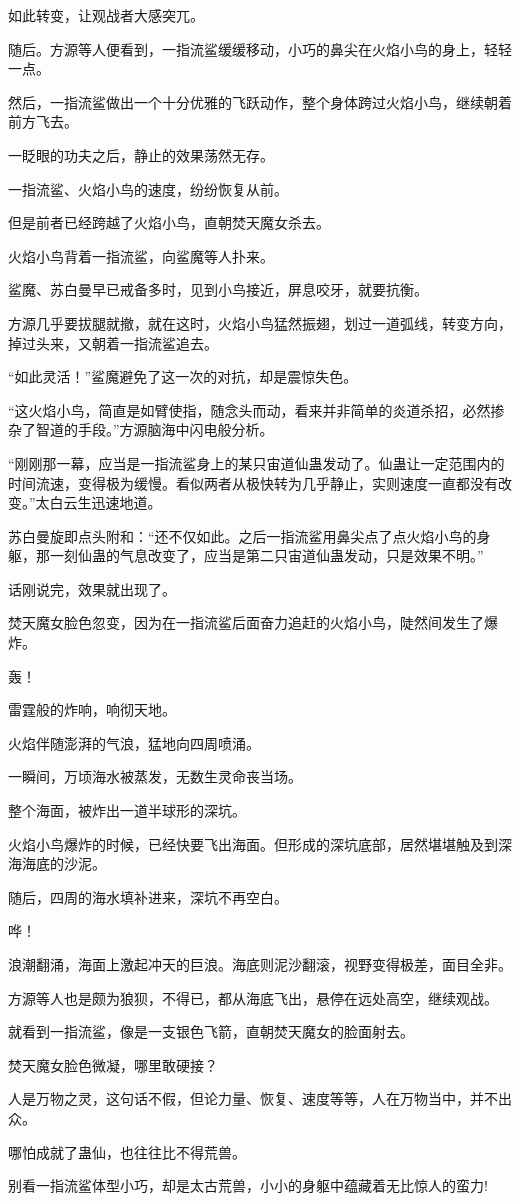 \begin{this_body}
如此转变，让观战者大感突兀。

随后。方源等人便看到，一指流鲨缓缓移动，小巧的鼻尖在火焰小鸟的身上，轻轻一点。

然后，一指流鲨做出一个十分优雅的飞跃动作，整个身体跨过火焰小鸟，继续朝着前方飞去。

一眨眼的功夫之后，静止的效果荡然无存。

一指流鲨、火焰小鸟的速度，纷纷恢复从前。

但是前者已经跨越了火焰小鸟，直朝焚天魔女杀去。

火焰小鸟背着一指流鲨，向鲨魔等人扑来。

鲨魔、苏白曼早已戒备多时，见到小鸟接近，屏息咬牙，就要抗衡。

方源几乎要拔腿就撤，就在这时，火焰小鸟猛然振翅，划过一道弧线，转变方向，掉过头来，又朝着一指流鲨追去。

“如此灵活！”鲨魔避免了这一次的对抗，却是震惊失色。

“这火焰小鸟，简直是如臂使指，随念头而动，看来并非简单的炎道杀招，必然掺杂了智道的手段。”方源脑海中闪电般分析。

“刚刚那一幕，应当是一指流鲨身上的某只宙道仙蛊发动了。仙蛊让一定范围内的时间流速，变得极为缓慢。看似两者从极快转为几乎静止，实则速度一直都没有改变。”太白云生迅速地道。

苏白曼旋即点头附和：“还不仅如此。之后一指流鲨用鼻尖点了点火焰小鸟的身躯，那一刻仙蛊的气息改变了，应当是第二只宙道仙蛊发动，只是效果不明。”

话刚说完，效果就出现了。

焚天魔女脸色忽变，因为在一指流鲨后面奋力追赶的火焰小鸟，陡然间发生了爆炸。

轰！

雷霆般的炸响，响彻天地。

火焰伴随澎湃的气浪，猛地向四周喷涌。

一瞬间，万顷海水被蒸发，无数生灵命丧当场。

整个海面，被炸出一道半球形的深坑。

火焰小鸟爆炸的时候，已经快要飞出海面。但形成的深坑底部，居然堪堪触及到深海海底的沙泥。

随后，四周的海水填补进来，深坑不再空白。

哗！

浪潮翻涌，海面上激起冲天的巨浪。海底则泥沙翻滚，视野变得极差，面目全非。

方源等人也是颇为狼狈，不得已，都从海底飞出，悬停在远处高空，继续观战。

就看到一指流鲨，像是一支银色飞箭，直朝焚天魔女的脸面射去。

焚天魔女脸色微凝，哪里敢硬接？

人是万物之灵，这句话不假，但论力量、恢复、速度等等，人在万物当中，并不出众。

哪怕成就了蛊仙，也往往比不得荒兽。

别看一指流鲨体型小巧，却是太古荒兽，小小的身躯中蕴藏着无比惊人的蛮力!

\end{this_body}

